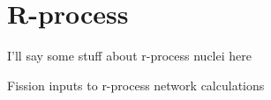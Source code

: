 \chapter{R-process}

\maketitle
I'll say some stuff about r-process nuclei here

Fission inputs to r-process network calculations